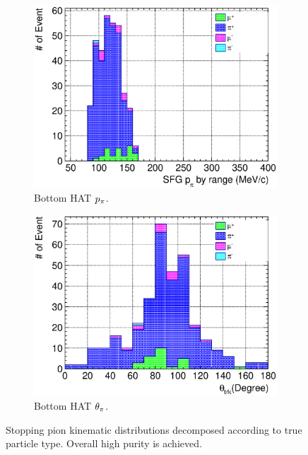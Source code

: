 \begin{figure}[ht]
\begin{subfigure}{\dbfigwid\textwidth}
               \end{subfigure}
               \\
               \begin{subfigure}{\dbfigwid\textwidth}
                    \includegraphics[width=\textwidth]{figures/sel/sspi_BOT_pi_mombr_stack_al6_zoom.eps}
                    \caption{Bottom HAT $p_{\pi}$.}
                    \label{subfig:sppi-bot-ppi}
               \end{subfigure}
               \begin{subfigure}{\dbfigwid\textwidth}
                    \includegraphics[width=\textwidth]{figures/sel/sspi_BOT_theta_trk_stack_al6_zoom.eps}
                    \caption{Bottom HAT $\theta_{\pi}$.}
                    \label{subfig:sppi-bot-tpi}
               \end{subfigure}
               \caption{Stopping pion kinematic distributions decomposed according to true particle type. Overall high purity is achieved.}
               \label{fig:sppi-kin}
          \end{figure}

